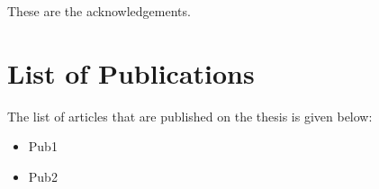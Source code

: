 \documentclass{unicam_thesis}
\theoremstyle{definition} \newtheorem{esempio}{Esempio}[chapter]
\theoremstyle{definition}
\begin{document}
  
               
    These are the acknowledgements.
 
    \newpage
    

   
    
    
    
    \tableofcontents
    
    
    
    
     
    
    \clearpage
    \chapter*{List of Publications}
    The list of articles that are published on the thesis is given below:
    \begin{itemize}
        \item Pub1
        \item Pub2
    \end{itemize}
 
  
    
    
   
      
   
   
   
    
    
    
    
    
    
    \clearpage
    \listofalgorithms
    
    \clearpage
    \listoffigures
    
    \clearpage
    \listoftables

    
    
\end{document}
